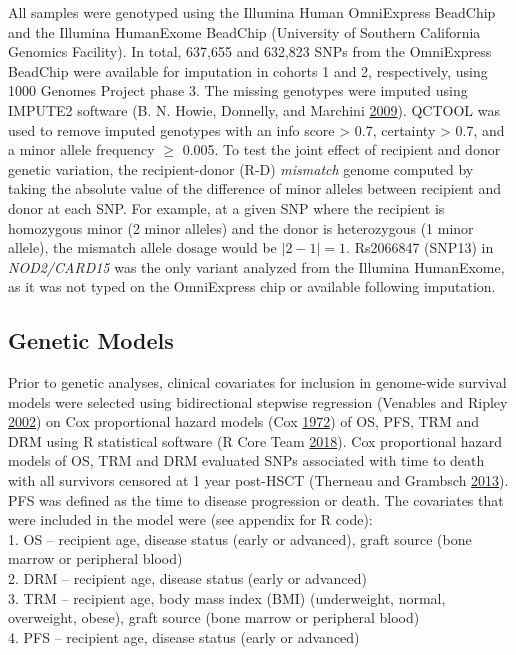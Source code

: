 \documentclass[]{DissertateOSU}
\begin{document}
All samples were genotyped using the Illumina Human OmniExpress BeadChip
and the Illumina HumanExome BeadChip (University of Southern California
Genomics Facility). In total, 637,655 and 632,823 SNPs from the
OmniExpress BeadChip were available for imputation in cohorts 1 and 2,
respectively, using 1000 Genomes Project phase 3. The missing genotypes
were imputed using IMPUTE2 software (B. N. Howie, Donnelly, and Marchini
\protect\hyperlink{ref-Howie_2009}{2009}). QCTOOL was used to remove
imputed genotypes with an info score \textgreater{} 0.7, certainty
\textgreater{} 0.7, and a minor allele frequency \(\geq\) 0.005. To test
the joint effect of recipient and donor genetic variation, the
recipient-donor (R-D) \emph{mismatch} genome computed by taking the
absolute value of the difference of minor alleles between recipient and
donor at each SNP. For example, at a given SNP where the recipient is
homozygous minor (2 minor alleles) and the donor is heterozygous (1
minor allele), the mismatch allele dosage would be \(|2-1|=1\).
Rs2066847 (SNP13) in \emph{NOD2/CARD15} was the only variant analyzed
from the Illumina HumanExome, as it was not typed on the OmniExpress
chip or available following imputation.

\subsection{Genetic Models}\label{genetic-models}

Prior to genetic analyses, clinical covariates for inclusion in
genome-wide survival models were selected using bidirectional stepwise
regression (Venables and Ripley
\protect\hyperlink{ref-Venables_2002}{2002}) on Cox proportional hazard
models (Cox \protect\hyperlink{ref-cox1972}{1972}) of OS, PFS, TRM and
DRM using R statistical software (R Core Team
\protect\hyperlink{ref-r_core}{2018}). Cox proportional hazard models of
OS, TRM and DRM evaluated SNPs associated with time to death with all
survivors censored at 1 year post-HSCT (Therneau and Grambsch
\protect\hyperlink{ref-therneau2013}{2013}). PFS was defined as the time
to disease progression or death. The covariates that were included in
the model were (see appendix for R code):\\
1. OS -- recipient age, disease status (early or advanced), graft source
(bone marrow or peripheral blood)\\
2. DRM -- recipient age, disease status (early or advanced)\\
3. TRM -- recipient age, body mass index (BMI) (underweight, normal,
overweight, obese), graft source (bone marrow or peripheral blood)\\
4. PFS -- recipient age, disease status (early or advanced)
\end{document}

